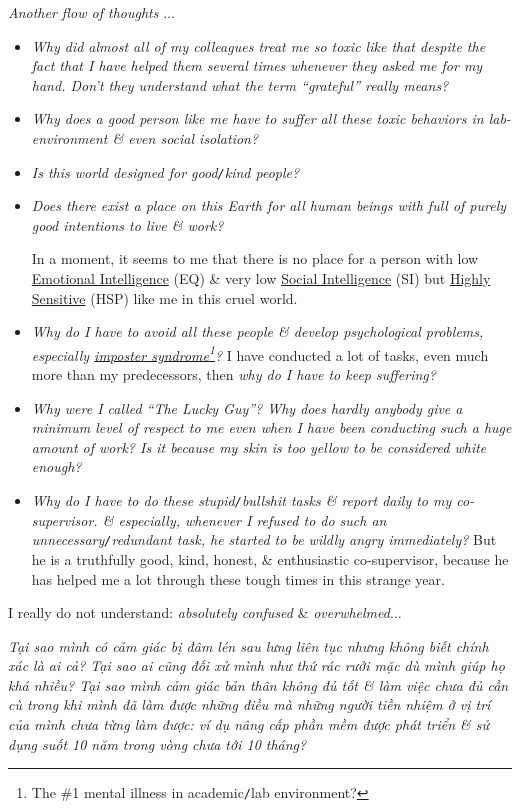 \documentclass[12pt,twoside]{book}
\begin{document}
{\it Another flow of thoughts} $\ldots$
\begin{itemize}
	\setlength\itemsep{0em}
	\item {\it Why did almost all of my colleagues treat me so toxic like that despite the fact that I have helped them several times whenever they asked me for my hand. Don't they understand what the term ``grateful'' really means?}
	\item {\it Why does a good person like me have to suffer all these toxic behaviors in lab-environment \& even social isolation?}
	\item {\it Is this world designed for good{\tt/}kind people?}
	\item {\it Does there exist a place on this Earth for all human beings with full of purely good intentions to live \& work?}
	
	In a moment, it seems to me that there is no place for a person with low \href{https://en.wikipedia.org/wiki/Emotional_intelligence}{Emotional Intelligence} (EQ) \& very low \href{https://en.wikipedia.org/wiki/Social_intelligence}{Social Intelligence} (SI) but \href{https://hsperson.com/}{Highly Sensitive} (HSP) like me in this cruel world.    
	\item {\it Why do I have to avoid all these people \& develop psychological problems, especially \href{https://en.wikipedia.org/wiki/Impostor_syndrome}{imposter syndrome}\footnote{The \#1 mental illness in academic{\tt/}lab environment?}?} I have conducted a lot of tasks, even much more than my predecessors, then {\it why do I have to keep suffering?}
	\item {\it Why were I called ``The Lucky Guy''? Why does hardly anybody give a minimum level of respect to me even when I have been conducting such a huge amount of work? Is it because my skin is too yellow to be considered white enough?}
	\item {\it Why do I have to do these stupid{\tt/}bullshit tasks \& report daily to my co-supervisor. \& especially, whenever I refused to do such an unnecessary{\tt/}redundant task, he started to be wildly angry immediately?} But he is a truthfully good, kind, honest, \& enthusiastic co-supervisor, because he has helped me a lot through these tough times in this strange year.
\end{itemize}
I really do not understand: {\it absolutely confused} \& {\it overwhelmed}$\ldots$

{\it Tại sao mình có cảm giác bị đâm lén sau lưng liên tục nhưng không biết chính xác là ai cả? Tại sao ai cũng đối xử mình như thứ rác rưởi mặc dù mình giúp họ khá nhiều? Tại sao mình cảm giác bản thân không đủ tốt \& làm việc chưa đủ cần cù trong khi mình đã làm được những điều mà những người tiền nhiệm ở vị trí của mình chưa từng làm được: ví dụ nâng cấp phần mềm được phát triển \& sử dụng suốt 10 năm trong vòng chưa tới 10 tháng?}
\end{document}
